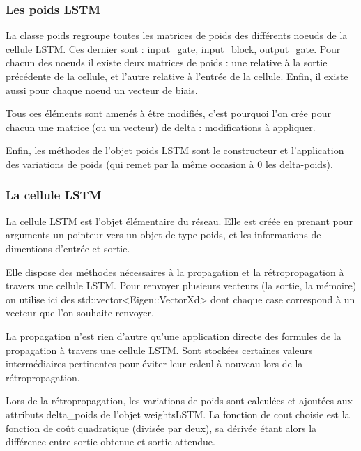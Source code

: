 \subsubsection{Les poids LSTM}

La classe poids regroupe toutes les matrices de poids des différents noeuds
de la cellule LSTM. Ces dernier sont : input\_gate, input\_block, output\_gate.
Pour chacun des noeuds il existe deux matrices de poids : une relative à
la sortie précédente de la cellule, et l'autre relative à l'entrée de la
cellule. Enfin, il existe aussi pour chaque noeud un vecteur de biais.

\medskip

Tous ces éléments sont amenés à être modifiés, c'est pourquoi l'on crée pour
chacun une matrice (ou un vecteur) de delta : modifications à appliquer.

\medskip

Enfin, les méthodes de l'objet poids LSTM sont le constructeur et
l'application des variations de poids (qui remet par la même occasion à 0
les delta-poids).

\subsubsection{La cellule LSTM}

La cellule LSTM est l'objet élémentaire du réseau. Elle est créée en prenant
pour arguments un pointeur vers un objet de type poids, et les informations de
dimentions d'entrée et sortie.

\medskip

Elle dispose des méthodes nécessaires à la propagation et la rétropropagation
à travers une cellule LSTM.
Pour renvoyer plusieurs vecteurs (la sortie, la mémoire) on utilise ici des
std::vector<Eigen::VectorXd> dont chaque case correspond à un vecteur que l'on
souhaite renvoyer.

\medskip

La propagation n'est rien d'autre qu'une application directe des formules de la
propagation à travers une cellule LSTM. Sont stockées certaines valeurs
intermédiaires pertinentes pour éviter leur calcul à nouveau lors de la
rétropropagation.

\medskip

Lors de la rétropropagation, les variations de poids sont calculées et ajoutées
aux attributs delta\_poids de l'objet weightsLSTM. La fonction de cout choisie
est la fonction de coût quadratique (divisée par deux), sa dérivée étant alors
la différence entre sortie obtenue et sortie attendue.


